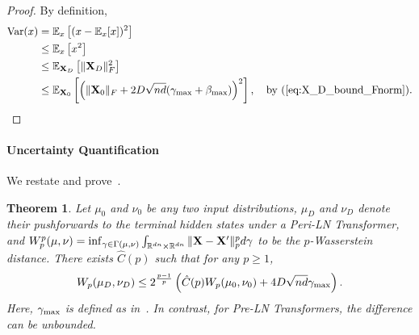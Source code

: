 \documentclass[journal]{IEEEtran}
\def\eqref#1{equation~\ref{#1}}
\newcommand{\bfX}{{\bf X}}
\renewcommand{\eqref}[1]{(\ref{#1})}
\theoremstyle{plain}
\newtheorem{theorem}{Theorem}
\theoremstyle{definition}
\theoremstyle{remark}
\newcounter{tmpTheoremCounter}
\newcommand{\settheoremnumber}[1]{%
  \setcounter{tmpTheoremCounter}{\value{theorem}}%
  \setcounter{theorem}{\getrefnumber{#1}}%
  \addtocounter{theorem}{-1}%
}
\newcommand{\restoretheoremnumber}{%
  \setcounter{theorem}{\value{tmpTheoremCounter}}%
}
\begin{document}
\begin{proof}
By definition,
\begin{align*}
    {\rm Var}(x) &= \mathbb{E}_{x} \left[ ( x -\mathbb{E}_x[x])^2 \right] \\
    & \leq \mathbb{E}_x \left[ x^2 \right] \\
    & \leq \mathbb{E}_{\bfX_D}  \left[ \|\bfX_D \|_F^2 \right] \\
    &\leq \mathbb{E}_{\bfX_0} \left[ \left(  \|\bfX_0\|_F + 2D\sqrt{nd}(\gamma_{\rm max} + \beta_{\rm max}) \right)^2\right], \quad \text{by \eqref{eq:X_D_bound_Fnorm}}.
\end{align*}
\end{proof}

\paragraph{Uncertainty Quantification} We restate and prove~.

\settheoremnumber{thm:uq}


\begin{theorem}
    Let $\mu_0$ and $\nu_0$ be any two input distributions, $\mu_D$ and $\nu_D$ denote their pushforwards to the terminal hidden states under a Peri-LN Transformer, and $W^p_p(\mu,\nu) = \inf_{\gamma \in \Gamma(\mu,\nu)} \int_{\mathbb{R}^{dn} \times \mathbb{R}^{dn}} \|\bfX-\bfX'\|_p^p d\gamma $ to be the $p$-Wasserstein distance. There exists $\hat{C}(p)$ such that for any $p \geq 1$,
    \begin{equation}
        W_p(\mu_D,\nu_D) \leq 2^{\frac{p-1}{p}} \left( \hat{C}(p)W_p(\mu_0,\nu_0) +4 D \sqrt{nd}   \gamma_{\rm max}\right).
    \end{equation}
    Here, $ \gamma_{\rm max}$ is defined as in~. In contrast, for Pre-LN Transformers, the difference can be unbounded.
\end{theorem}
\restoretheoremnumber
\end{document}
